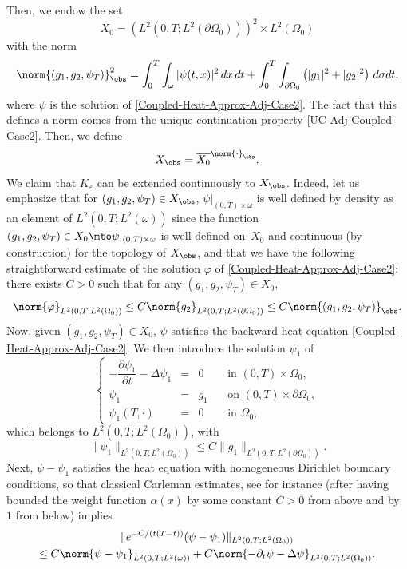 Then, we endow the set
\[
X_{0} = (L^2(0,T; L^2(\partial \Omega_0)))^2 \times L^2(\Omega_0)
\]
with the norm
\[
\norm{(g_1, g_2, \psi_T)}_{\obs}^2
=
\int_0^T \int_\omega |\psi(t,x)|^2 \, dx\,dt
+
\int_0^T \int_{\partial \Omega_0} \left(| g_1|^2 + |g_2|^2 \right) \, d\sigma dt,
\]
where $\psi$ is the solution of \eqref{Coupled-Heat-Approx-Adj-Case2}. The fact that this defines a norm comes from the unique continuation property \eqref{UC-Adj-Coupled-Case2}. Then, we define\begin{equation*}
X_{\obs} = \overline{X_{0}}^{\norm{\cdot}_{\obs}}.
\end{equation*}
We claim that $K_\varepsilon$ can be extended continuously to $X_{\obs}$. Indeed, let us emphasize that for $(g_1, g_2, \psi_T) \in X_{\obs}$, $\psi|_{(0,T) \times \omega}$ is well defined by density as an element of $L^2(0,T;L^2(\omega))$ since the function $(g_1, g_2, \psi_T) \in X_{0} \mto \psi|_{(0,T) \times \omega}$ is well-defined on~$X_0$ and continuous (by construction) for the topology of $X_{\obs}$, and that we have the following straightforward estimate of the solution $\varphi$ of \eqref{Coupled-Heat-Approx-Adj-Case2}: there exists $C>0$ such that for any $(g_1, g_2, \psi_T) \in X_{0}$,
\begin{equation}
\label{Est-Varphi-Direct}
\norm{ \varphi }_{L^2(0,T; L^2(\Omega_0))} \leq C \norm{ g_2}_{L^2(0,T; L^2(\partial \Omega_0))} \leq C \norm{(g_1, g_2, \psi_T)}_{\obs}.
\end{equation}
Now, given $(g_1, g_2, \psi_T) \in X_0$, $\psi$ satisfies the backward heat equation \eqref{Coupled-Heat-Approx-Adj-Case2}. We then introduce the solution $\psi_1$ of
\[
\left\{
\begin{array}{rcll}
- \dfrac{\partial \psi_1}{\partial t}-\Delta \psi_1 &=& 0 \quad&\text{ in }(0,T) \times \Omega_0,
\\
\psi_1 &=& g_1 &\text{ on }(0,T) \times \partial \Omega_0,
\\
\psi_1 \left(T,\cdot\right) &=& 0 &\text{ in }\Omega_0,
\end{array}
\right.
\]
which belongs to $L^2(0,T; L^2(\Omega_0))$, with
\[
\| \psi_1 \|_{L^2(0,T; L^2(\Omega_0))} \leq C \| g_1\|_{ L^2(0,T; L^2(\partial \Omega_0))}.
\]
Next, $\psi - \psi_1$ satisfies the heat equation with homogeneous Dirichlet boundary conditions, so that classical Carleman estimates, see for instance \cite[Th.\,9.4.1]{TWBook} (after having bounded the weight function $\alpha(x)$ by some constant $C>0$ from above and by $1$ from below) implies
\begin{multline*}
\| e^{-C/(t(T-t))} (\psi - \psi_1) \|_{L^2(0,T; L^2(\Omega_0))}\\
\leq
C \norm{\psi- \psi_1}_{L^2(0,T; L^2(\omega))}
+
{C\norm{ - \partial_t \psi - \Delta \psi }_{L^2(0,T; L^2(\Omega_0))}}.
\end{multline*}
